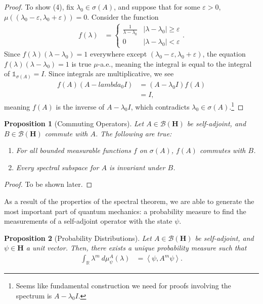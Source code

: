 \documentclass[12pt]{extarticle}
\newcommand{\R}{\mathbb{R}}
\newcommand{\iprod}[2]{\left\langle #1,#2\right\rangle}
\theoremstyle{plain}
\newtheorem*{proposition}{Proposition}%
\theoremstyle{definition}
\theoremstyle{remark}
\begin{document}
\begin{proof}
    To show (4), fix $\lambda_0\in \sigma(A)$, and suppose that for some $\varepsilon > 0$, $\mu\left((\lambda_0 - \varepsilon, \lambda_0 + \varepsilon)\right) = 0$. Consider the function
    \begin{align*}
      f(\lambda) &= \begin{cases}
        \frac{1}{\lambda - \lambda_0} & \left\vert \lambda - \lambda_0 \right\vert \geq \varepsilon\\
        0 & \left\vert \lambda - \lambda_0 \right\vert < \varepsilon
      \end{cases}.
    \end{align*}
    Since $f(\lambda)\left(\lambda - \lambda_0\right) = 1$ everywhere except $(\lambda_0 - \varepsilon,\lambda_0 + \varepsilon)$, the equation $f(\lambda)\left(\lambda - \lambda_0\right) = 1$ is true $\mu$-a.e., meaning the integral is equal to the integral of $\mathbb{1}_{\sigma(A)} = I$. Since integrals are multiplicative, we see
    \begin{align*}
      f(A)\left(A - lambda_0 I\right) &= \left(A - \lambda_0 I\right)f(A)\\
                                      &= I,
    \end{align*}
    meaning $f(A)$ is the inverse of $A - \lambda_0 I$, which contradicts $\lambda_0 \in \sigma(A)$.\footnote{Seems like fundamental construction we need for proofs involving the spectrum is $A - \lambda_0 I$.}
  \end{proof}
  \begin{proposition}[Commuting Operators]
    Let $A\in \mathcal{B}\left(\mathbf{H}\right)$ be self-adjoint, and $B\in \mathcal{B}\left(\mathbf{H}\right)$ commute with $A$. The following are true:
    \begin{enumerate}[(1)]
      \item For all bounded measurable functions $f$ on $\sigma(A)$, $f(A)$ commutes with $B$.
      \item Every spectral subspace for $A$ is invariant under $B$.
    \end{enumerate}
  \end{proposition}
  \begin{proof}
    To be shown later.
  \end{proof}
  As a result of the properties of the spectral theorem, we are able to generate the most important part of quantum mechanics: a probability measure to find the measurements of a self-adjoint operator with the state $\psi$.
  \begin{proposition}[Probability Distributions]
    Let $A\in \mathcal{B}\left(\mathbf{H}\right)$ be self-adjoint, and $\psi \in \mathbf{H}$ a unit vector. Then, there exists a unique probability measure such that
    \begin{align*}
      \int_{\R}^{} \lambda^{m}\:d\mu^{A}_{\psi}(\lambda) &= \iprod{\psi}{A^{m}\psi}.
    \end{align*}
  \end{proposition}
\end{document}

